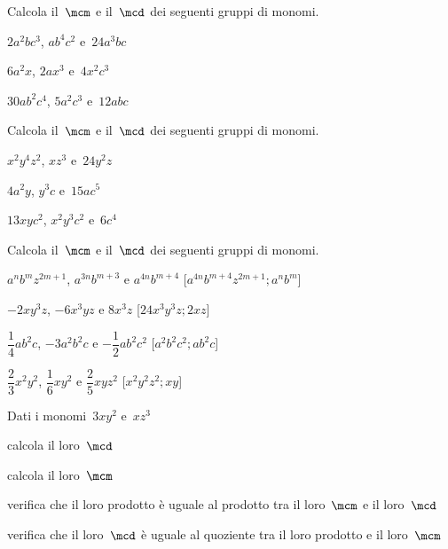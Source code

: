 \begin{esercizio}
 \label{ese:9.46}
Calcola il~\(\mcm\) e il~\(\mcd\) dei seguenti gruppi di monomi.

\begin{enumeratea}
 \item \(2a^{2}bc^{3}\), \(ab^{4}c^{2}\) e~\(24a^{3}bc\)
 \item \(6a^{2}x\), \(2ax^{3}\) e~\(4x^{2}c^{3}\)
 \item \(30ab^{2}c^{4}\), \(5a^{2}c^{3}\) e~\(12abc\)
\end{enumeratea}
\end{esercizio}

\begin{esercizio}
 \label{ese:9.47}
Calcola il~\(\mcm\) e il~\(\mcd\) dei seguenti gruppi di monomi.

\begin{enumeratea}
 \item \(x^{2}y^{4}z^{2}\), \(xz^{3}\) e~\(24y^{2}z\)
 \item \(4a^{2}y\), \(y^{3}c\) e~\(15ac^{5}\)
 \item \(13xyc^{2}\), \(x^{2}y^{3}c^{2}\) e~\(6c^{4}\)
\end{enumeratea}
\end{esercizio}

\begin{esercizio}[\Ast]
 \label{ese:9.48}
Calcola il~\(\mcm\) e il~\(\mcd\) dei seguenti gruppi di monomi.

\begin{enumeratea}
 \item \(a^{n}b^{m}z^{2m+1}\), \quad \(a^{3n}b^{m+3}\) \quad e \quad 
\(a^{4n}b^{m+4}\) 
 \hfill[\(a^{4n}b^{m+4}z^{2m+1}; a^{n}b^{m}\)]
 \item \(-2xy^{3}z\), \quad \(-6x^{3}yz\) \quad e \quad \(8x^{3}z\) 
 \hfill[\(24x^{3}y^{3}z; 2xz\)]
 \item \(\dfrac{1}{4}ab^{2}c\), \quad \(-3a^{2}b^{2}c\) \quad e \quad 
\(-{\dfrac{1}{2}}ab^{2}c^{2}\) 
 \hfill[\(a^{2}b^{2}c^{2};ab^{2}c\)]
 \item \(\dfrac{2}{3}x^{2}y^{2}\), \quad \(\dfrac{1}{6}xy^{2}\) \quad e \quad 
\(\dfrac{2}{5}xyz^{2}\) 
 \hfill[\(x^{2}y^{2}z^{2};xy\)]
\end{enumeratea}
\end{esercizio}

\begin{esercizio}
 \label{ese:9.49}
Dati i monomi~\(3xy^{2}\) e~\(xz^{3}\)

\begin{enumeratea}
\item calcola il loro~\(\mcd\)
\item calcola il loro~\(\mcm\)
\item verifica che il loro prodotto è uguale al prodotto tra il loro~\(\mcm\) e il 
loro~\(\mcd\)
\item verifica che il loro~\(\mcd\) è uguale al quoziente tra il loro prodotto e 
il loro~\(\mcm\)
\end{enumeratea}
\end{esercizio}

